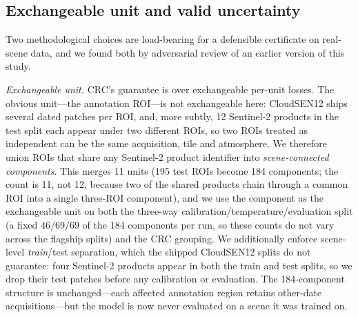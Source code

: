\documentclass[preprint,3p,times]{elsarticle}
\begin{document}
\subsection{Exchangeable unit and valid uncertainty}
\label{sec:unit}
Two methodological choices are load-bearing for a defensible certificate on real-scene data, and we found both by adversarial review of an earlier version of this study.

\emph{Exchangeable unit.} CRC's guarantee is over exchangeable per-unit losses. The obvious unit---the annotation ROI---is not exchangeable here: CloudSEN12 ships several dated patches per ROI, and, more subtly, 12 Sentinel-2 products in the test split each appear under two different ROIs, so two ROIs treated as independent can be the same acquisition, tile and atmosphere. We therefore union ROIs that share any Sentinel-2 product identifier into \emph{scene-connected components}. This merges 11 units (195 test ROIs become 184 components; the count is 11, not 12, because two of the shared products chain through a common ROI into a single three-ROI component), and we use the component as the exchangeable unit on both the three-way calibration/temperature/evaluation split (a fixed $46/69/69$ of the 184 components per run, so these counts do not vary across the flagship splits) and the CRC grouping. We additionally enforce scene-level \emph{train}/test separation, which the shipped CloudSEN12 splits do not guarantee: four Sentinel-2 products appear in both the train and test splits, so we drop their test patches before any calibration or evaluation. The 184-component structure is unchanged---each affected annotation region retains other-date acquisitions---but the model is now never evaluated on a scene it was trained on.
\end{document}
